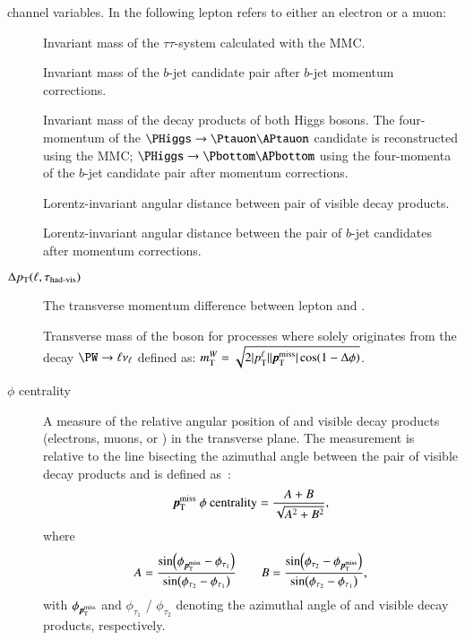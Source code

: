 \lephad channel variables. In the following lepton refers to either an
electron or a muon:
\begin{description}

\item[\mMMC] Invariant mass of the $\tau\tau$-system calculated with
  the MMC.

\item[\mBB] Invariant mass of the $b$-jet candidate pair after $b$-jet
  momentum corrections.

\item[\mHH] Invariant mass of the decay products of both Higgs
  bosons. The four-momentum of the $\PHiggs \ra \Ptauon \APtauon$
  candidate is reconstructed using the MMC;
  $\PHiggs \ra \Pbottom \APbottom$ using the four-momenta of the
  $b$-jet candidate pair after momentum corrections.

\item[\dRtautau] Lorentz-invariant angular distance between pair of
  visible \taulepton decay products.

\item[\dRbb] Lorentz-invariant angular distance between the pair of
  $b$-jet candidates after momentum corrections.

\item[$\Delta p_{\text{T}}(\ell, \tau_{\text{had-vis}})$] The transverse momentum
  difference between lepton and \tauhadvis.

\item[\mTW] Transverse mass of the \PW boson for processes where
  \pTmiss solely originates from the decay $\PW \ra \ell \nu_\ell$ defined as:
  $\mTW = \sqrt{2 |\pT^{\ell}| |\pTmiss| \cos(1 - \Delta\phi)}$.

\item[\pTmiss $\phi$ centrality] A measure of the relative angular
  position of \pTmiss and visible \taulepton decay products
  (electrons, muons, or \tauhadvis) in the transverse plane. The
  measurement is relative to the line bisecting the azimuthal angle
  between the pair of visible \taulepton decay products and is defined
  as~\cite{HIGG-2013-32, HIGG-2016-16-witherratum}:
  \begin{align*}
    \pTmiss\text{ }\phi\text{ centrality} = \frac{A + B}{\sqrt{A^2 + B^2}} \text{,}
  \end{align*}
  where
  \begin{align*}
    A = \frac{\sin(\phi_{\pTmiss} - \phi_{\tau_1})}{\sin(\phi_{\tau_2} - \phi_{\tau_1})} \qquad B = \frac{\sin(\phi_{\tau_2} - \phi_{\pTmiss})}{\sin(\phi_{\tau_2} - \phi_{\tau_1})} \text{,}
  \end{align*}
  with $\phi_{\pTmiss}$ and $\phi_{\tau_1}$ / $\phi_{\tau_2}$ denoting
  the azimuthal angle of \pTmiss and visible \taulepton decay
  products, respectively.


\end{description}
